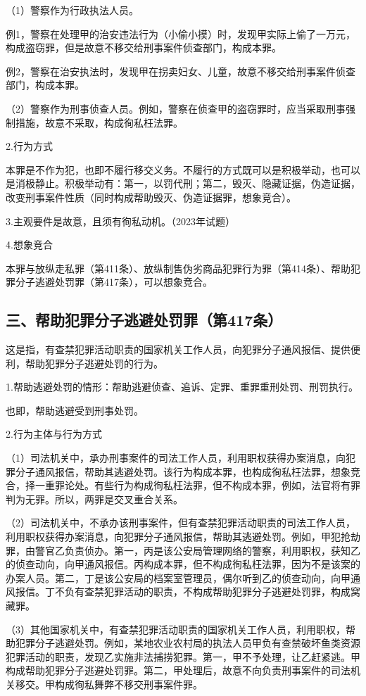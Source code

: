 （1）警察作为行政执法人员。

例1，警察在处理甲的治安违法行为（小偷小摸）时，发现甲实际上偷了一万元，构成盗窃罪，但是故意不移交给刑事案件侦查部门，构成本罪。

例2，警察在治安执法时，发现甲在拐卖妇女、儿童，故意不移交给刑事案件侦查部门，构成本罪。

（2）警察作为刑事侦查人员。例如，警察在侦查甲的盗窃罪时，应当采取刑事强制措施，故意不采取，构成徇私枉法罪。

2.行为方式

本罪是不作为犯，也即不履行移交义务。不履行的方式既可以是积极举动，也可以是消极静止。积极举动有：第一，以罚代刑；第二，毁灭、隐藏证据，伪造证据，改变刑事案件性质（同时构成帮助毁灭、伪造证据罪，想象竞合）。

3.主观要件是故意，且须有徇私动机。（2023年试题）

4.想象竞合

本罪与放纵走私罪（第411条）、放纵制售伪劣商品犯罪行为罪（第414条）、帮助犯罪分子逃避处罚罪（第417条），可以想象竞合。

\subsection*{三、帮助犯罪分子逃避处罚罪（第417条）}

这是指，有查禁犯罪活动职责的国家机关工作人员，向犯罪分子通风报信、提供便利，帮助犯罪分子逃避处罚的行为。

1.帮助逃避处罚的情形：帮助逃避侦查、追诉、定罪、重罪重刑处罚、刑罚执行。

也即，帮助逃避受到刑事处罚。

2.行为主体与行为方式

（1）司法机关中，承办刑事案件的司法工作人员，利用职权获得办案消息，向犯罪分子通风报信，帮助其逃避处罚。该行为构成本罪，也构成徇私枉法罪，想象竞合，择一重罪论处。有些行为构成徇私枉法罪，但不构成本罪，例如，法官将有罪判为无罪。所以，两罪是交叉重合关系。

（2）司法机关中，不承办该刑事案件，但有查禁犯罪活动职责的司法工作人员，利用职权获得办案消息，向犯罪分子通风报信，帮助其逃避处罚。例如，甲犯抢劫罪，由警官乙负责侦办。第一，丙是该公安局管理网络的警察，利用职权，获知乙的侦查动向，向甲通风报信。丙构成本罪，但不构成徇私枉法罪，因为不是该案的办案人员。第二，丁是该公安局的档案室管理员，偶尔听到乙的侦查动向，向甲通风报信。丁不负有查禁犯罪活动的职责，不构成帮助犯罪分子逃避处罚罪，构成窝藏罪。

（3）其他国家机关中，有查禁犯罪活动职责的国家机关工作人员，利用职权，帮助犯罪分子逃避处罚。例如，某地农业农村局的执法人员甲负有查禁破坏鱼类资源犯罪活动的职责，发现乙实施非法捕捞犯罪。第一，甲不予处理，让乙赶紧逃。甲构成帮助犯罪分子逃避处罚罪。第二，甲处理后，故意不向负责刑事案件的司法机关移交。甲构成徇私舞弊不移交刑事案件罪。

